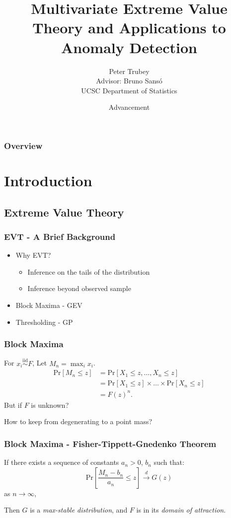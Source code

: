 \documentclass[aspectratio=169]{beamer}
\title{Multivariate Extreme Value Theory and Applications to Anomaly Detection}
\author{Peter Trubey \\ Advisor: Bruno Sans{\'o} \\ UCSC Department of Statistics}
\date[8/25/2021]{Advancement}
\begin{document}
\begin{frame}
  \titlepage
\end{frame}

\begin{frame}
  \frametitle{Overview}
  \tableofcontents
\end{frame}

\section{Introduction}

\subsection{Extreme Value Theory}

\begin{frame}
  \frametitle{EVT - A Brief Background}
  \begin{itemize}
    \item Why EVT?
        \begin{itemize}
            \item Inference on the tails of the distribution
            \item Inference beyond observed sample
        \end{itemize}
    \item Block Maxima - GEV
    \item Thresholding - GP
  \end{itemize}
\end{frame}

\begin{frame}
  \frametitle{Block Maxima}
  For $x_i \stackrel{\text{iid}}{\sim} F$, Let $M_n = \max_{i} x_i$.
  \begin{equation*}
    \begin{aligned}
      \text{Pr}\left[M_n\leq z\right] &= \text{Pr}\left[X_1 \leq z, \ldots, X_n \leq z\right]\\
        &= \text{Pr}\left[X_1\leq z\right]\times\ldots\times\text{Pr}\left[X_n\leq z\right]\\
        &= F(z)^n.
    \end{aligned}
  \end{equation*}
  But if $F$ is unknown?

  How to keep from degenerating to a point mass?
\end{frame}

\begin{frame}
  \frametitle{Block Maxima - Fisher-Tippett-Gnedenko Theorem}
  If there exists a sequence of constants $a_n > 0$, $b_n$ such that:
  \begin{equation*}
    \text{Pr}\left[\frac{M_n - b_n}{a_n} \leq z\right] \stackrel{d}{\rightarrow} G(z)
  \end{equation*}
  as $n\to\infty$,

  Then $G$ is a \emph{max-stable distribution}, and $F$ is in its \emph{domain of attraction}.
\end{frame}
\end{document}
